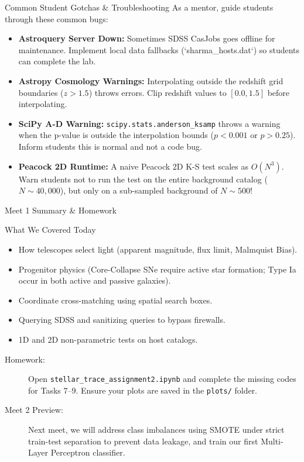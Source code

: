 \documentclass[9pt]{beamer}
\begin{document}
\begin{frame}{Common Student Gotchas \& Troubleshooting}
  As a mentor, guide students through these common bugs:
  \begin{itemize}
    \item \textbf{Astroquery Server Down:}
      Sometimes SDSS CasJobs goes offline for maintenance. Implement local data fallbacks (`sharma\_hosts.dat`) so students can complete the lab.
    \item \textbf{Astropy Cosmology Warnings:}
      Interpolating outside the redshift grid boundaries ($z > 1.5$) throws errors. Clip redshift values to $[0.0, 1.5]$ before interpolating.
    \item \textbf{SciPy A-D Warning:}
      \texttt{scipy.stats.anderson\_ksamp} throws a warning when the p-value is outside the interpolation bounds ($p < 0.001$ or $p > 0.25$). Inform students this is normal and not a code bug.
    \item \textbf{Peacock 2D Runtime:}
      A naive Peacock 2D K-S test scales as $O(N^3)$. Warn students not to run the test on the entire background catalog ($N \sim 40,000$), but only on a sub-sampled background of $N \sim 500$!
  \end{itemize}
\end{frame}

\begin{frame}{Meet 1 Summary \& Homework}
  \begin{block}{What We Covered Today}
    \begin{itemize}
      \item How telescopes select light (apparent magnitude, flux limit, Malmquist Bias).
      \item Progenitor physics (Core-Collapse SNe require active star formation; Type Ia occur in both active and passive galaxies).
      \item Coordinate cross-matching using spatial search boxes.
      \item Querying SDSS and sanitizing queries to bypass firewalls.
      \item 1D and 2D non-parametric tests on host catalogs.
    \end{itemize}
  \end{block}
  \begin{description}
    \item[Homework:] Open \texttt{stellar\_trace\_assignment2.ipynb} and complete the missing codes for Tasks 7--9. Ensure your plots are saved in the \texttt{plots/} folder.
    \item[Meet 2 Preview:] Next meet, we will address class imbalances using SMOTE under strict train-test separation to prevent data leakage, and train our first Multi-Layer Perceptron classifier.
  \end{description}
\end{frame}
\end{document}
